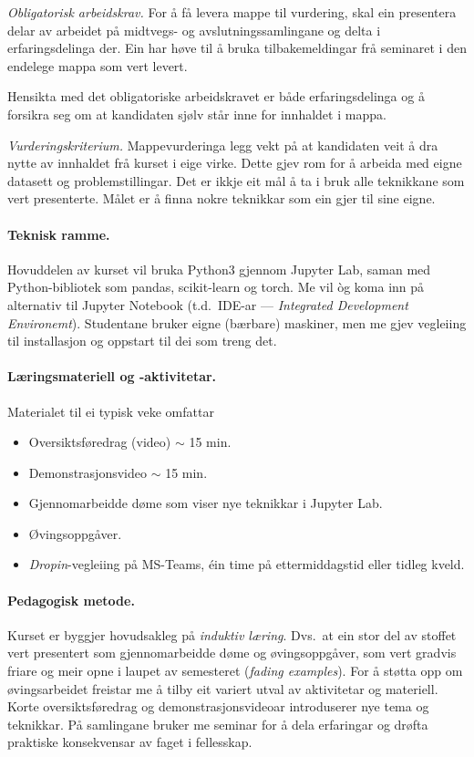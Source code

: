 \documentclass[nynorsk]{scrartcl}
\begin{document}
\emph{Obligatorisk arbeidskrav.}
For å få levera mappe til vurdering, skal ein presentera delar av arbeidet på
midtvegs- og avslutningssamlingane og delta i erfaringsdelinga der.
Ein har høve til å bruka tilbakemeldingar frå seminaret i den endelege mappa
som vert levert.

Hensikta med det obligatoriske arbeidskravet er både erfaringsdelinga
og å forsikra seg om at kandidaten sjølv står inne for innhaldet i mappa.

\emph{Vurderingskriterium.}
Mappevurderinga legg vekt på at kandidaten veit å dra nytte av innhaldet
frå kurset i eige virke.
Dette gjev rom for å arbeida med eigne datasett og problemstillingar.
Det er ikkje eit mål å ta i bruk alle teknikkane som vert presenterte.
Målet er å finna nokre teknikkar som ein gjer til sine eigne.

\paragraph{Teknisk ramme.}
Hovuddelen av kurset vil bruka Python3 gjennom Jupyter Lab, saman med
Python-bibliotek som pandas, scikit-learn og torch.  
Me vil òg koma inn på alternativ til Jupyter Notebook (t.d.\ IDE-ar 
--- \emph{Integrated Development Environemt}).
Studentane bruker eigne (bærbare) maskiner, men me gjev vegleiing til installasjon
og oppstart til dei som treng det.

\paragraph{Læringsmateriell og -aktivitetar.}
Materialet til ei typisk veke omfattar
\begin{itemize}
        \item Oversiktsføredrag (video) $\sim$ 15 min.
        \item Demonstrasjonsvideo $\sim$ 15 min.
        \item Gjennomarbeidde døme som viser nye teknikkar i Jupyter Lab.
        \item Øvingsoppgåver.
	\item \emph{Dropin}-vegleiing på MS-Teams, éin time på ettermiddagstid 
	   eller tidleg kveld.
\end{itemize}

\paragraph{Pedagogisk metode.}
Kurset er byggjer hovudsakleg på \emph{induktiv læring}.
Dvs.\ at ein stor del av stoffet vert presentert som gjennomarbeidde
døme og øvingsoppgåver, som vert gradvis friare og meir opne i laupet
av semesteret (\emph{fading examples}).
For å støtta opp om øvingsarbeidet freistar me å tilby eit variert utval
av aktivitetar og materiell.
Korte oversiktsføredrag og demonstrasjonsvideoar introduserer nye tema og teknikkar.
På samlingane bruker me seminar for å dela erfaringar og drøfta praktiske
konsekvensar av faget i fellesskap.
\end{document}
